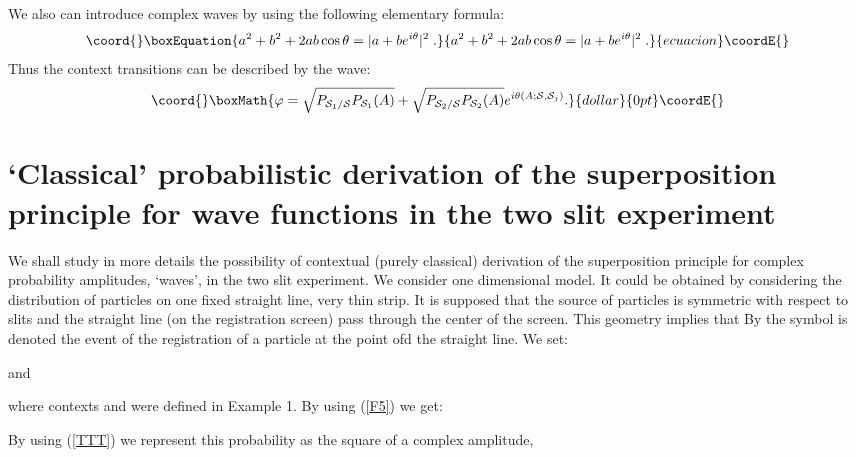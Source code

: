 \documentclass[12pt,oneside,final,a4paper]{article}
\begin{document}
We also can introduce 
complex waves by using the following 
elementary formula: 
\begin{equation}\coord{}\boxEquation{
\label{TTT}
a^2 + b^2 + 2 ab \cos\theta=|a+ b e^{i\theta}|^2\; .
}{
a^2 + b^2 + 2 ab \cos\theta=|a+ b e^{i\theta}|^2\; .
}{ecuacion}\coordE{}\end{equation}
Thus the context transitions 
\coordHE{} can be described by the wave:
$$\coord{}\boxMath{
\varphi=\sqrt{P_{{\cal S}_1/{\cal S}}  P_{{\cal S}_1}(A)} 
+ \sqrt{P_{{\cal S}_2/{\cal S}}  P_{{\cal S}_2}(A)}e^{i\theta(A; {\cal S}, {\cal S}_j)}.
}{dollar}{0pt}\coordE{}$$


\section{`Classical' probabilistic derivation of the superposition
principle for wave functions in the two slit experiment}

We shall study in more details the possibility of
contextual (purely classical) derivation of the superposition
principle for complex probability amplitudes, `waves', 
in the two slit experiment. We consider one dimensional
model. It could be obtained by considering the distribution of 
particles on one fixed straight line, very thin strip. It is supposed
that the source of particles is symmetric with respect to slits and 
the straight line (on the registration screen) pass through the center
of the screen. This geometry implies that 
\coordHE{} By the symbol \coordHE{}
is denoted the event of  the registration of a particle at the point \coordHE{} 
ofd the straight line. We set:

\coordHE{} and \coordHE{}

where contexts \coordHE{} and \coordHE{} were defined in Example 1.
By using
(\ref{F5}) we get:

\coordHE{}

By using (\ref{TTT}) we represent this probability as the square of a complex
amplitude, \coordHE{}
\end{document}
